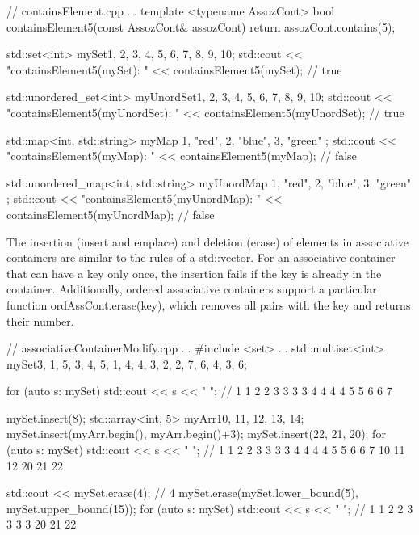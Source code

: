 \begin{cpp}
// containsElement.cpp
...
template <typename AssozCont>
bool containsElement5(const AssozCont& assozCont) {
	return assozCont.contains(5);
}

std::set<int> mySet{1, 2, 3, 4, 5, 6, 7, 8, 9, 10};
std::cout << "containsElement5(mySet): "
		  << containsElement5(mySet); // true

std::unordered_set<int> myUnordSet{1, 2, 3, 4, 5, 6, 7, 8, 9, 10};
std::cout << "containsElement5(myUnordSet): "
		  << containsElement5(myUnordSet); // true

std::map<int, std::string> myMap{ {1, "red"}, {2, "blue"}, {3, "green"} };
std::cout << "containsElement5(myMap): "
		  << containsElement5(myMap); // false

std::unordered_map<int, std::string> myUnordMap{ {1, "red"}, {2, "blue"},
												 {3, "green"} };
std::cout << "containsElement5(myUnordMap): "
		  << containsElement5(myUnordMap); // false
\end{cpp}



The insertion (insert and emplace) and deletion (erase) of elements in associative containers are similar to the rules of a std::vector. For an associative container that can have a key only once, the insertion fails if the key is already in the container. Additionally, ordered associative containers support a particular function ordAssCont.erase(key), which removes all pairs with the key and returns their number.


\begin{cpp}
// associativeContainerModify.cpp
...
#include <set>
...
std::multiset<int> mySet{3, 1, 5, 3, 4, 5, 1, 4, 4, 3, 2, 2, 7, 6, 4, 3, 6};

for (auto s: mySet) std::cout << s << " ";
	// 1 1 2 2 3 3 3 3 4 4 4 4 5 5 6 6 7

mySet.insert(8);
std::array<int, 5> myArr{10, 11, 12, 13, 14};
mySet.insert(myArr.begin(), myArr.begin()+3);
mySet.insert({22, 21, 20});
for (auto s: mySet) std::cout << s << " ";
	// 1 1 2 2 3 3 3 3 4 4 4 4 5 5 6 6 7 10 11 12 20 21 22
	
std::cout << mySet.erase(4); // 4
mySet.erase(mySet.lower_bound(5), mySet.upper_bound(15));
for (auto s: mySet) std::cout << s << " ";
	// 1 1 2 2 3 3 3 3 20 21 22
\end{cpp}



